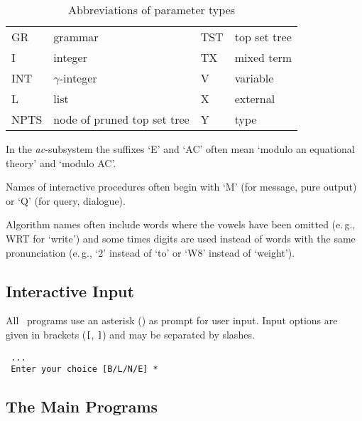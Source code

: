 \begin{table}
\begin{center}
\begin{tabular}{|l|l||l|l|}
  GR    & grammar                     &                                   
                                        TST   & top set tree \\           
  I     & integer                     &                                   
                                        TX    & mixed term \\             
  INT   & $\gamma$-integer            &                                   
                                        V     & variable \\               
  L     & list                        &                  
                                        X     & external \\               
  NPTS  & node of pruned top set tree &
                                        Y     & type \\                   
 \hline      
\end{tabular} 
\end{center}  
\caption{Abbreviations of parameter types} \label{ta:pt}
\end{table}
In the {\it ac}-subsystem the suffixes `E' and `AC' often mean `modulo an
equational theory' and `modulo AC'.

Names of interactive procedures often begin with `M' (for message, pure output)
or `Q' (for query, dialogue).

Algorithm names often include words where the vowels have been omitted
(e.\,g., WRT for `write') and some times digits are used instead of
words with the same pronunciation (e.\,g., `2' instead of `to' or
`W8' instead of `weight').

\subsection{Interactive Input}
All \redux\ programs use an asterisk ({\tt *}) as prompt for user input.
Input options are given in  brackets ({\tt [}, {\tt ]}) and may be separated by
slashes.
\begin{example}
\begin{verbatim}
 ...
 Enter your choice [B/L/N/E] *
\end{verbatim}
\end{example}

\subsection{The Main Programs}

